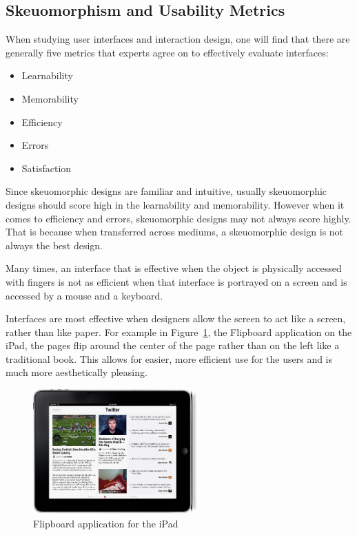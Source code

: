\documentclass{article}
\begin{document}
\subsection{Skeuomorphism and Usability Metrics}
	When studying user interfaces and interaction design, one will find that there are generally five metrics that experts agree on to effectively evaluate interfaces: 
\begin{itemize}
\item Learnability 
\item Memorability 
\item Efficiency 
\item Errors 
\item Satisfaction 
\end{itemize}

	Since skeuomorphic designs are familiar and intuitive, usually skeuomorphic designs should score high in the learnability and memorability. However when it comes to efficiency and errors, skeuomorphic designs may not always score highly. That is because when transferred across mediums, a skeuomorphic design is not always the best design. 
	\begin{emph}Many times, an interface that is effective when the object is physically accessed with fingers is not as efficient when that interface is portrayed on a screen and is accessed by a mouse and a keyboard. 
	\end{emph}
	
	Interfaces are most effective when designers allow the screen to act like a screen, rather than like paper. For example in Figure~\ref{Flipboard}, the Flipboard application on the iPad, the pages flip around the center of the page rather than on the left like a traditional book. This allows for easier, more efficient use for the users and is much more aesthetically pleasing.~\cite{wired}
\begin{figure}
\centering
\includegraphics[width=2.5in]{flipboard.jpeg} 

\caption{Flipboard application for the iPad}
\label{Flipboard}
\end{figure}
\end{document}
